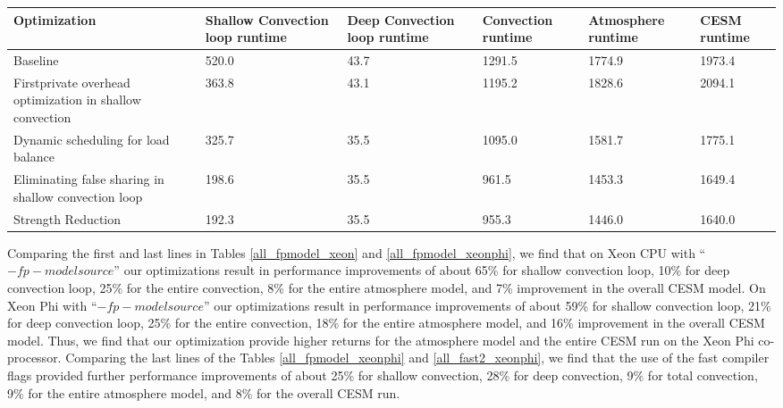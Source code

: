 \begin{table*}
 \small
 \centering
 \begin{tabular}{||p{1.5in}|p{0.75in}|p{0.75in}|p{0.75in}|p{0.75in}|p{0.75in}||}
\hline\hline
Optimization &	Shallow Convection loop runtime	& Deep Convection loop runtime	& Convection runtime & Atmosphere runtime & CESM runtime \\ \hline\hline
Baseline & 520.0 &43.7 & 1291.5 & 1774.9 & 1973.4 \\ \hline
Firstprivate overhead optimization in shallow convection & 363.8 & 43.1 & 1195.2 & 1828.6 & 2094.1 \\ \hline
Dynamic scheduling for load balance & 325.7 & 35.5 & 1095.0 & 1581.7 & 1775.1 \\ \hline
Eliminating false sharing in shallow convection loop & 198.6 & 35.5 & 961.5 & 1453.3 & 1649.4 \\ \hline
Strength Reduction & 192.3 & 35.5 & 955.3 & 1446.0 & 1640.0 \\ \hline\hline
  \end{tabular}
\caption{All optimizations - ``-fp-model fast=2 -fimf-precision=high'' on Xeon Phi. All times are in seconds}
\label{all_fast2_xeonphi}
\end{table*}

Comparing the first and last lines in Tables \ref{all_fpmodel_xeon} and \ref{all_fpmodel_xeonphi}, we find that on Xeon CPU with ``$-fp-model source$'' our optimizations result in performance improvements of about 65\% for shallow convection loop, 10\% for deep convection loop, 25\% for the entire convection, 8\% for the entire atmosphere model, and 7\% improvement in the overall CESM model. On Xeon Phi with ``$-fp-model source$'' our optimizations result in performance improvements of about 59\% for shallow convection loop, 21\% for deep convection loop, 25\% for the entire convection, 18\% for the entire atmosphere model, and 16\% improvement in the overall CESM model. Thus, we find that our optimization provide higher returns for the atmosphere model and the entire CESM run on the Xeon Phi co-processor. Comparing the last lines of the Tables \ref{all_fpmodel_xeonphi} and \ref{all_fast2_xeonphi}, we find that the use of the fast compiler flags provided further performance improvements of about 25\% for shallow convection, 28\% for deep convection, 9\% for total convection, 9\% for the entire atmosphere model, and 8\% for the overall CESM run.



